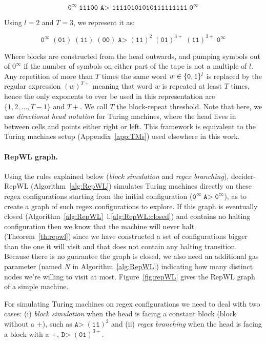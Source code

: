 $$ \texttt{0}^\infty \; \texttt{11100 A> 11110101010111111111} \; \texttt{0}^\infty$$

Using $l=2$ and $T = 3$, we represent it as:

$$ \texttt{0}^\infty \; (\texttt{01}) \; (\texttt{11}) \; (\texttt{00}) \; \texttt{A>} \; (\texttt{11})^2 \; (\texttt{01})^{3+} \; (\texttt{11})^{3+} \; \texttt{0}^\infty $$

Where blocks are constructed from the head outwards, and pumping symbols \szero out of $0^\infty$ if the number of symbols on either part of the tape is not a multiple of $l$. Any repetition of more than $T$ times the same word $w \in \{\texttt{0},\texttt{1}\}^l$ is replaced by the regular expression $(w)^{T+}$ meaning that word $w$ is repeated at least $T$ times, hence the only exponents to ever be used in this representation are $\{1,2,\dots,T-1\}$ and $T+$. We call $T$ the block-repeat threshold. Note that here, we use \textit{directional head notation} for Turing machines, where the head lives in between cells and points either right or left. This framework is equivalent to the Turing machines setup (Appendix~\ref{app:TMs}) used elsewhere in this work.

\paragraph{RepWL graph.} Using the rules explained below (\textit{block simulation} and \textit{regex branching}), {\sc decider-RepWL} (Algorithm~\ref{alg:RepWL}) simulates Turing machines directly on these regex configurations starting from the initial configuration (\ie $\texttt{0}^\infty \; \texttt{A>} \; \texttt{0}^\infty$), as to create a graph of such regex configurations to explore. If this graph is eventually closed (Algorithm~\ref{alg:RepWL}~l.\ref{alg:RepWL:closed}) and contains no halting configuration then we know that the machine will never halt (Theorem~\ref{th:repwl}) since we have constructed a set of configurations bigger than the one it will visit and that does not contain any halting transition. Because there is no guarantee the graph is closed, we also need an additional gas parameter (named $N$ in Algorithm~\ref{alg:RepWL}) indicating how many distinct nodes we're willing to visit at most. Figure~\ref{fig:repWL} gives the RepWL graph of a simple machine.

For simulating Turing machines on regex configurations we need to deal with two cases: (i) \textit{block simulation} when the head is facing a constant block (\ie block without a $+$), such as $\texttt{A>} \; (\texttt{11})^2$ and (ii) \textit{regex branching} when the head is facing a block with a $+$, \eg $\texttt{D>} \; (\texttt{01})^{3+}$.

